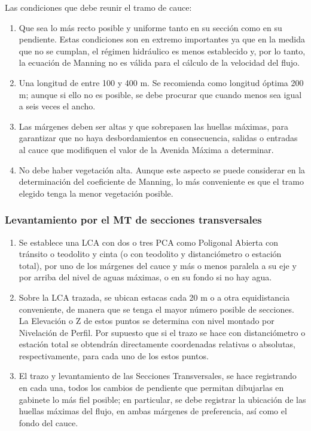       Las condiciones que debe reunir el tramo de cauce:
      \begin{enumerate}
          \item Que sea lo más recto posible y uniforme tanto en su sección como en su pendiente. Estas condiciones son en extremo importantes ya que en la medida que no se cumplan, el régimen hidráulico es menos establecido y, por lo tanto, la ecuación de Manning no es válida para el cálculo de la velocidad del flujo.
          \item Una longitud de entre 100 y 400 m. Se recomienda como longitud óptima 200 m; aunque si ello no es posible, se debe procurar que cuando menos sea igual a seis veces el ancho.
          \item Las márgenes deben ser altas y que sobrepasen las huellas máximas, para garantizar que no haya desbordamientos en consecuencia, salidas o entradas al cauce que modifiquen el valor de la Avenida Máxima a determinar.
          \item No debe haber vegetación alta. Aunque este aspecto se puede considerar en la determinación del coeficiente de Manning, lo más conveniente es que el tramo elegido tenga la menor vegetación posible.
      \end{enumerate}
      
      \subsubsection{Levantamiento por el MT de secciones transversales}
      
      \begin{enumerate}
          \item Se establece una LCA con dos o tres PCA como Poligonal Abierta con tránsito o teodolito y cinta (o con teodolito y distanciómetro o estación total), por uno de los márgenes del cauce y más o menos paralela a su eje y por arriba del nivel de aguas máximas, o en su fondo si no hay agua.
          \item Sobre la LCA trazada, se ubican estacas cada 20 m o a otra equidistancia conveniente, de manera que se tenga el mayor número posible de secciones. La Elevación o Z de estos puntos se determina con nivel montado por Nivelación de Perfil. Por supuesto que si el trazo se hace con distanciómetro o estación total se obtendrán directamente coordenadas relativas o absolutas, respectivamente, para cada uno de los estos puntos.
          \item El trazo y levantamiento de las Secciones Transversales, se hace registrando en cada una, todos los cambios de pendiente que permitan dibujarlas en gabinete lo más fiel posible; en particular, se debe registrar la ubicación de las huellas máximas del flujo, en ambas márgenes de preferencia, así como el fondo del cauce.
      \end{enumerate}
      
